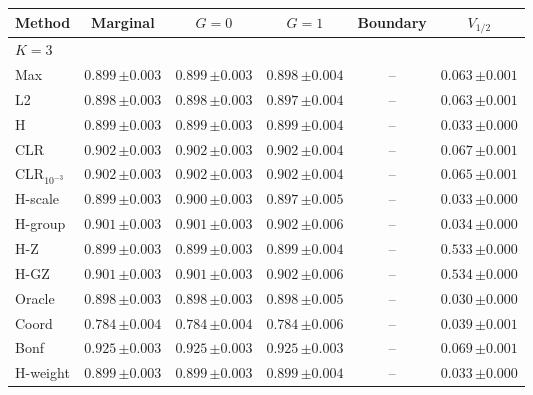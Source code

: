 \begin{tabular}{lccccc}\toprule
Method & Marginal & $G=0$ & $G=1$ & Boundary & $V_{1/2}$ \\\midrule
\multicolumn{6}{l}{$K=3$} \\
Max & $0.899\,{\scriptstyle\pm 0.003}$ & $0.899\,{\scriptstyle\pm 0.003}$ & $0.898\,{\scriptstyle\pm 0.004}$ & -- & $0.063\,{\scriptstyle\pm 0.001}$ \\
L2 & $0.898\,{\scriptstyle\pm 0.003}$ & $0.898\,{\scriptstyle\pm 0.003}$ & $0.897\,{\scriptstyle\pm 0.004}$ & -- & $0.063\,{\scriptstyle\pm 0.001}$ \\
H & $0.899\,{\scriptstyle\pm 0.003}$ & $0.899\,{\scriptstyle\pm 0.003}$ & $0.899\,{\scriptstyle\pm 0.004}$ & -- & $0.033\,{\scriptstyle\pm 0.000}$ \\
CLR & $0.902\,{\scriptstyle\pm 0.003}$ & $0.902\,{\scriptstyle\pm 0.003}$ & $0.902\,{\scriptstyle\pm 0.004}$ & -- & $0.067\,{\scriptstyle\pm 0.001}$ \\
CLR$_{10^{-3}}$ & $0.902\,{\scriptstyle\pm 0.003}$ & $0.902\,{\scriptstyle\pm 0.003}$ & $0.902\,{\scriptstyle\pm 0.004}$ & -- & $0.065\,{\scriptstyle\pm 0.001}$ \\
H-scale & $0.899\,{\scriptstyle\pm 0.003}$ & $0.900\,{\scriptstyle\pm 0.003}$ & $0.897\,{\scriptstyle\pm 0.005}$ & -- & $0.033\,{\scriptstyle\pm 0.000}$ \\
H-group & $0.901\,{\scriptstyle\pm 0.003}$ & $0.901\,{\scriptstyle\pm 0.003}$ & $0.902\,{\scriptstyle\pm 0.006}$ & -- & $0.034\,{\scriptstyle\pm 0.000}$ \\
H-Z & $0.899\,{\scriptstyle\pm 0.003}$ & $0.899\,{\scriptstyle\pm 0.003}$ & $0.899\,{\scriptstyle\pm 0.004}$ & -- & $0.533\,{\scriptstyle\pm 0.000}$ \\
H-GZ & $0.901\,{\scriptstyle\pm 0.003}$ & $0.901\,{\scriptstyle\pm 0.003}$ & $0.902\,{\scriptstyle\pm 0.006}$ & -- & $0.534\,{\scriptstyle\pm 0.000}$ \\
Oracle & $0.898\,{\scriptstyle\pm 0.003}$ & $0.898\,{\scriptstyle\pm 0.003}$ & $0.898\,{\scriptstyle\pm 0.005}$ & -- & $0.030\,{\scriptstyle\pm 0.000}$ \\
Coord & $0.784\,{\scriptstyle\pm 0.004}$ & $0.784\,{\scriptstyle\pm 0.004}$ & $0.784\,{\scriptstyle\pm 0.006}$ & -- & $0.039\,{\scriptstyle\pm 0.001}$ \\
Bonf & $0.925\,{\scriptstyle\pm 0.003}$ & $0.925\,{\scriptstyle\pm 0.003}$ & $0.925\,{\scriptstyle\pm 0.003}$ & -- & $0.069\,{\scriptstyle\pm 0.001}$ \\
H-weight & $0.899\,{\scriptstyle\pm 0.003}$ & $0.899\,{\scriptstyle\pm 0.003}$ & $0.899\,{\scriptstyle\pm 0.004}$ & -- & $0.033\,{\scriptstyle\pm 0.000}$ \\

\end{tabular}
